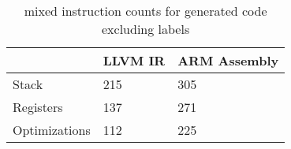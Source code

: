 \begin{table}[h!]
\centering
\begin{tabular}{p{}p{}p{}}
  \hline
 & LLVM IR & ARM Assembly \\ 
  \hline
Stack & 215 & 305 \\ 
  Registers & 137 & 271 \\ 
  Optimizations & 112 & 225 \\ 
   \hline
\end{tabular}
\caption{mixed instruction counts for generated code excluding labels}
\end{table}
